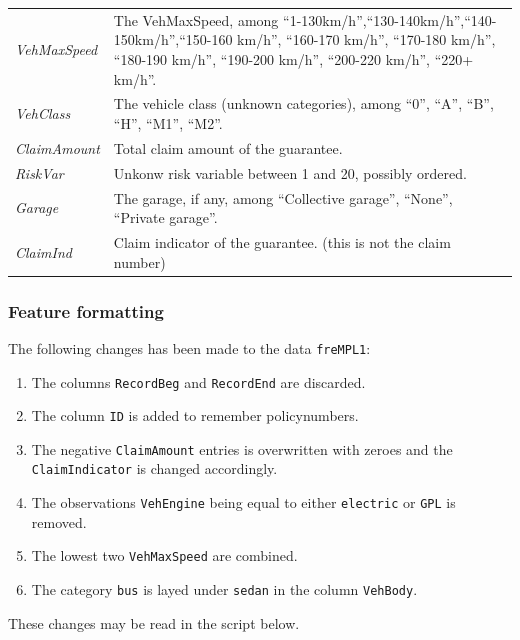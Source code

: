 \documentclass[
]{article}
\providecommand{\tightlist}{%
  \setlength{\itemsep}{0pt}\setlength{\parskip}{0pt}}
\begin{document}
\begin{longtable}[]{@{}
  >{\raggedright\arraybackslash}p{}
  >{\raggedright\arraybackslash}p{}@{}}
\emph{VehMaxSpeed} & The VehMaxSpeed, among
``1-130km/h'',``130-140km/h'',``140-150km/h'',``150-160 km/h'',
``160-170 km/h'', ``170-180 km/h'', ``180-190 km/h'', ``190-200 km/h'',
``200-220 km/h'', ``220+ km/h''. \\
\emph{VehClass} & The vehicle class (unknown categories), among ``0'',
``A'', ``B'', ``H'', ``M1'', ``M2''. \\
\emph{ClaimAmount} & Total claim amount of the guarantee. \\
\emph{RiskVar} & Unkonw risk variable between 1 and 20, possibly
ordered. \\
\emph{Garage} & The garage, if any, among ``Collective garage'',
``None'', ``Private garage''. \\
\emph{ClaimInd} & Claim indicator of the guarantee. (this is not the
claim number) \\
\bottomrule()
\end{longtable}

\hypertarget{feature-formatting}{%
\subsubsection{Feature formatting}\label{feature-formatting}}

The following changes has been made to the data \texttt{freMPL1}:

\begin{enumerate}
\def\labelenumi{\arabic{enumi}.}
\tightlist
\item
  The columns \texttt{RecordBeg} and \texttt{RecordEnd} are discarded.
\item
  The column \texttt{ID} is added to remember policynumbers.
\item
  The negative \texttt{ClaimAmount} entries is overwritten with zeroes
  and the \texttt{ClaimIndicator} is changed accordingly.
\item
  The observations \texttt{VehEngine} being equal to either
  \texttt{electric} or \texttt{GPL} is removed.
\item
  The lowest two \texttt{VehMaxSpeed} are combined.
\item
  The category \texttt{bus} is layed under \texttt{sedan} in the column
  \texttt{VehBody}.
\end{enumerate}

These changes may be read in the script below.
\end{document}
